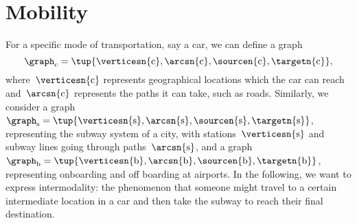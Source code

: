 
\section{Mobility}

For a specific mode of transportation, say a car, we can define a graph
\begin{equation*}
    \graph_\mathrm{c}=\tup{
        \verticesn{\mathrm{c}},
        \arcsn{\mathrm{c}},
        \sourcen{\mathrm{c}},
        \targetn{\mathrm{c}}
    },
\end{equation*}
where~$\verticesn{\mathrm{c}}$ represents geographical locations which the car can reach and~$\arcsn{\mathrm{c}}$ represents the paths it can take, such as roads.
Similarly, we consider a graph~$\graph_\mathrm{s}=\tup{\verticesn{\mathrm{s}},\arcsn{\mathrm{s}},\sourcen{\mathrm{s}},\targetn{\mathrm{s}}}$, representing the subway system of a city, with stations~$\verticesn{\mathrm{s}}$ and subway lines going through paths~$\arcsn{\mathrm{s}}$, and a graph~$\graph_\mathrm{b}=\tup{\verticesn{\mathrm{b}},\arcsn{\mathrm{b}},\sourcen{\mathrm{b}},\targetn{\mathrm{b}}}$, representing onboarding and off boarding at airports.
In the following, we want to express intermodality: the phenomenon that someone might travel to a certain intermediate location in a car and then take the subway to reach their final destination.

